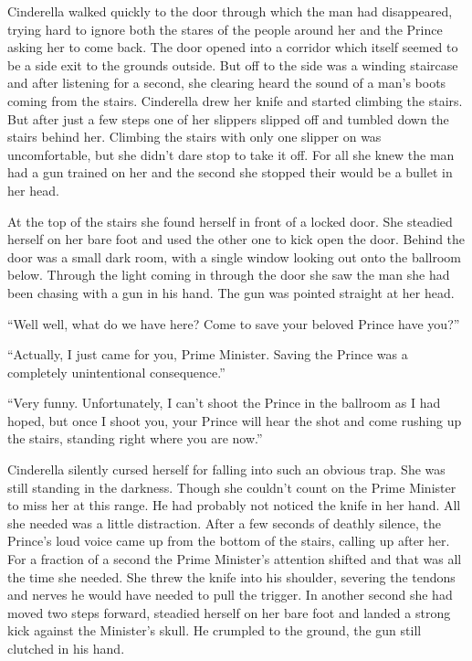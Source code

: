 \documentclass[11pt,letterpaper]{article}
\begin{document}
Cinderella walked quickly to the door through which the man had disappeared, trying hard to ignore both the stares of the people around her and the Prince asking her to come back. The door opened into a corridor which itself seemed to be a side exit to the grounds outside. But off to the side was a winding staircase and after listening for a second, she clearing heard the sound of a man's boots coming from the stairs. Cinderella drew her knife and started climbing the stairs. But after just a few steps one of her slippers slipped off and tumbled down the stairs behind her. Climbing the stairs with only one slipper on was uncomfortable, but she didn't dare stop to take it off. For all she knew the man had a gun trained on her and the second she stopped their would be a bullet in her head.

At the top of the stairs she found herself in front of a locked door. She steadied herself on her bare foot and used the other one to kick open the door. Behind the door was a small dark room, with a single window looking out onto the ballroom below. Through the light coming in through the door she saw the man she had been chasing with a gun in his hand. The gun was pointed straight at her head.

``Well well, what do we have here? Come to save your beloved Prince have you?''

``Actually, I just came for you, Prime Minister. Saving the Prince was a completely unintentional consequence.''

``Very funny. Unfortunately, I can't shoot the Prince in the ballroom as I had hoped, but once I shoot you, your Prince will hear the shot and come rushing up the stairs, standing right where you are now.''

Cinderella silently cursed herself for falling into such an obvious trap. She was still standing in the darkness. Though she couldn't count on the Prime Minister to miss her at this range. He had probably not noticed the knife in her hand. All she needed was a little distraction. After a few seconds of deathly silence, the Prince's loud voice came up from the bottom of the stairs, calling up after her. For a fraction of a second the Prime Minister's attention shifted and that was all the time she needed. She threw the knife into his shoulder, severing the tendons and nerves he would have needed to pull the trigger. In another second she had moved two steps forward, steadied herself on her bare foot and landed a strong kick against the Minister's skull. He crumpled to the ground, the gun still clutched in his hand.
\end{document}
